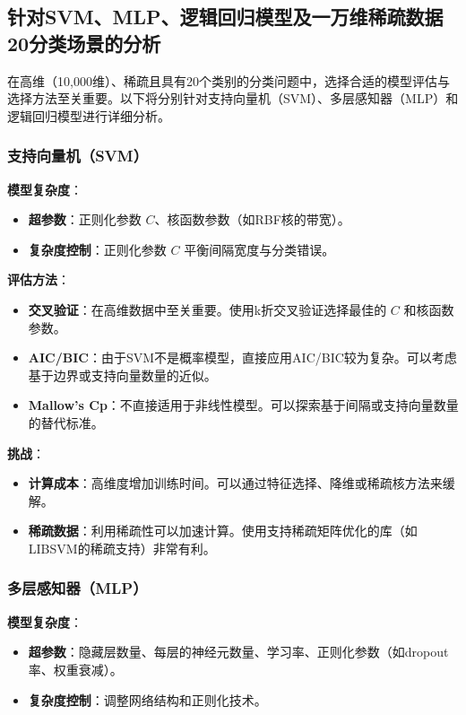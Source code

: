 \documentclass[11pt,a4paper]{article}
\begin{document}
\subsection{针对SVM、MLP、逻辑回归模型及一万维稀疏数据20分类场景的分析}

在高维（10,000维）、稀疏且具有20个类别的分类问题中，选择合适的模型评估与选择方法至关重要。以下将分别针对支持向量机（SVM）、多层感知器（MLP）和逻辑回归模型进行详细分析。

\subsubsection{支持向量机（SVM）}

\textbf{模型复杂度}：

\begin{itemize}
    \item \textbf{超参数}：正则化参数 $C$、核函数参数（如RBF核的带宽）。
    \item \textbf{复杂度控制}：正则化参数 $C$ 平衡间隔宽度与分类错误。
\end{itemize}

\textbf{评估方法}：

\begin{itemize}
    \item \textbf{交叉验证}：在高维数据中至关重要。使用k折交叉验证选择最佳的 $C$ 和核函数参数。
    \item \textbf{AIC/BIC}：由于SVM不是概率模型，直接应用AIC/BIC较为复杂。可以考虑基于边界或支持向量数量的近似。
    \item \textbf{Mallow’s Cp}：不直接适用于非线性模型。可以探索基于间隔或支持向量数量的替代标准。
\end{itemize}

\textbf{挑战}：

\begin{itemize}
    \item \textbf{计算成本}：高维度增加训练时间。可以通过特征选择、降维或稀疏核方法来缓解。
    \item \textbf{稀疏数据}：利用稀疏性可以加速计算。使用支持稀疏矩阵优化的库（如LIBSVM的稀疏支持）非常有利。
\end{itemize}

\subsubsection{多层感知器（MLP）}

\textbf{模型复杂度}：

\begin{itemize}
    \item \textbf{超参数}：隐藏层数量、每层的神经元数量、学习率、正则化参数（如dropout率、权重衰减）。
    \item \textbf{复杂度控制}：调整网络结构和正则化技术。
\end{itemize}
\end{document}
